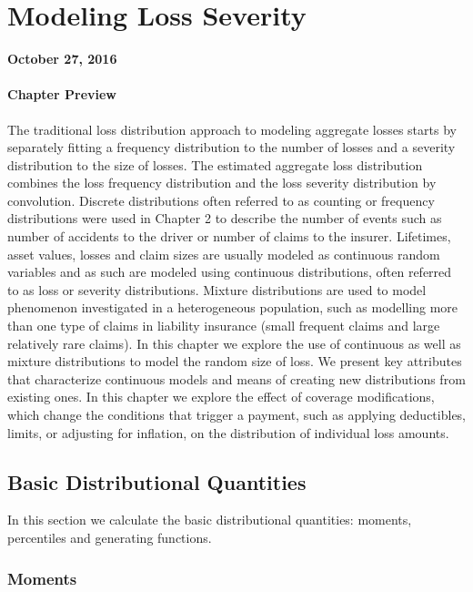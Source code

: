 \documentclass[]{book}
\theoremstyle{definition}
\theoremstyle{definition}
\theoremstyle{definition}
\theoremstyle{remark}
\begin{document}
\chapter{Modeling Loss Severity}\label{modeling-loss-severity}

\textbf{October 27, 2016}

\subsubsection*{Chapter Preview}\label{chapter-preview}

The traditional loss distribution approach to modeling aggregate losses
starts by separately fitting a frequency distribution to the number of
losses and a severity distribution to the size of losses. The estimated
aggregate loss distribution combines the loss frequency distribution and
the loss severity distribution by convolution. Discrete distributions
often referred to as counting or frequency distributions were used in
Chapter 2 to describe the number of events such as number of accidents
to the driver or number of claims to the insurer. Lifetimes, asset
values, losses and claim sizes are usually modeled as continuous random
variables and as such are modeled using continuous distributions, often
referred to as loss or severity distributions. Mixture distributions are
used to model phenomenon investigated in a heterogeneous population,
such as modelling more than one type of claims in liability insurance
(small frequent claims and large relatively rare claims). In this
chapter we explore the use of continuous as well as mixture
distributions to model the random size of loss. We present key
attributes that characterize continuous models and means of creating new
distributions from existing ones. In this chapter we explore the effect
of coverage modifications, which change the conditions that trigger a
payment, such as applying deductibles, limits, or adjusting for
inflation, on the distribution of individual loss amounts.

\section{Basic Distributional Quantities}\label{BasicQuantities}

In this section we calculate the basic distributional quantities:
moments, percentiles and generating functions.

\subsection{Moments}\label{moments}
\end{document}
